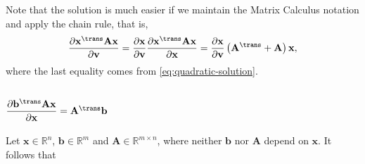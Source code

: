 Note that the solution is much easier if we maintain the Matrix Calculus notation and apply the chain rule, that is,
\begin{align}
    \dfrac{\partial \mathbf{x}^\trans \mathbf{A} \mathbf{x}}{\partial \mathbf{v}} = \dfrac{\partial \mathbf{x}}{\partial \mathbf{v}} \dfrac{\partial \mathbf{x}^\trans \mathbf{A} \mathbf{x}}{\partial \mathbf{x}} = \dfrac{\partial \mathbf{x}}{\partial \mathbf{v}} \left(\mathbf{A}^\trans + \mathbf{A}\right) \mathbf{x},
\end{align}
where the last equality comes from \eqref{eq:quadratic-solution}.

\subsection{\(\dfrac{\partial \mathbf{b}^\trans \mathbf{A} \mathbf{x}}{\partial \mathbf{x}} = \mathbf{A}^\trans \mathbf{b}\)} \label{sec:bt-A-x}
Let \(\mathbf{x} \in \mathbb{R}^{n}\), \(\mathbf{b} \in \mathbb{R}^{m}\) and \(\mathbf{A}\in \mathbb{R}^{m\times n}\), where neither \(\mathbf{b}\) nor \(\mathbf{A}\) depend on \(\mathbf{x}\). It follows that


